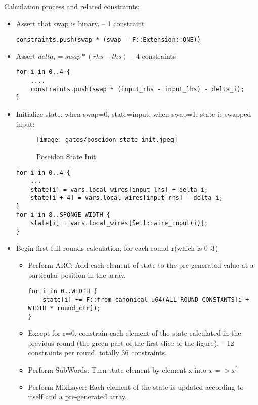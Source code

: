 Calculation process and related constraints:
\begin{itemize}
    \item Assert that swap is binary. -- 1 constraint
    \begin{lstlisting}
constraints.push(swap * (swap - F::Extension::ONE))
    \end{lstlisting}
    \item Assert $delta_i = swap * (rhs - lhs)$ -- 4 constraints
    \begin{lstlisting}
for i in 0..4 {
    ....
    constraints.push(swap * (input_rhs - input_lhs) - delta_i);
}
    \end{lstlisting}
    \item Initialize state: when swap=0, state=input; when swap=1, state is swapped input:
    \begin{figure}[!ht]
        \centering
        \texttt{[image: gates/poseidon\_state\_init.jpeg]}
        \caption{Poseidon State Init}
        \label{fig:poseidon-state-init}
    \end{figure}
    \begin{lstlisting}
for i in 0..4 {
    ...
    state[i] = vars.local_wires[input_lhs] + delta_i;
    state[i + 4] = vars.local_wires[input_rhs] - delta_i;
}
for i in 8..SPONGE_WIDTH {
    state[i] = vars.local_wires[Self::wire_input(i)];
}
    \end{lstlisting}
    \item Begin first full rounds calculation, for each round r(which is 0~3)
    \begin{itemize}
        \item Perform ARC: Add each element of state to the pre-generated value at a particular position in the array.
        \begin{lstlisting}
for i in 0..WIDTH {
    state[i] += F::from_canonical_u64(ALL_ROUND_CONSTANTS[i + WIDTH * round_ctr]);
}
        \end{lstlisting}
        \item Except for r=0, constrain each element of the state calculated in the previous round (the green part of the first slice of the figure). 
        -- 12 constraints per round, totally 36 constraints.
        \item Perform SubWords: Turn state element by element x into $x => x^7$
        \item Perform MixLayer: Each element of the state is updated according to itself and a pre-generated array.
        \begin{lstlisting}

\end{lstlisting}
\end{itemize}
\end{itemize}
